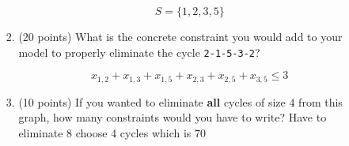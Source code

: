 \documentclass[letterpaper,oneside,12pt]{article}%
\newcommand{\blu}{\color{blue}}
\begin{document}
\begin{enumerate}
\begin{enumerate}
\begin{enumerate}
{\blu
\[
S = \{1,2,3,5\}
\]
}			
			
			\item (20 points) What is the concrete constraint you would add to your model to properly eliminate the cycle \verb|2-1-5-3-2|? 
{
\blu

\[
x_{1,2}+x_{1,3}+x_{1,5}+x_{2,3}+x_{2,5}+x_{3,5} \leq 3
\]
}			
			
			\item (10 points) If you wanted to eliminate \textbf{all} cycles of size 4 from this graph, how many constraints would you have to write? 
			{
			\blu
			Have to eliminate $8$ choose $4$ cycles which is $70$
			}
			\end{enumerate}
		\end{enumerate}
\end{enumerate}
\end{document}
